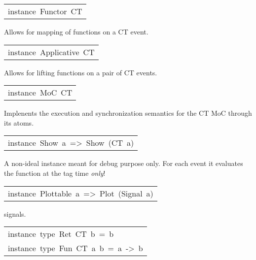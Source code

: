 \begin{haddockdesc}
\item[\begin{tabular}{@{}l}
instance\ Functor\ CT
\end{tabular}]\haddockbegindoc
Allows for mapping of functions on a CT event.\par

\end{haddockdesc}
\begin{haddockdesc}
\item[\begin{tabular}{@{}l}
instance\ Applicative\ CT
\end{tabular}]\haddockbegindoc
Allows for lifting functions on a pair of CT events.\par

\end{haddockdesc}
\begin{haddockdesc}
\item[\begin{tabular}{@{}l}
instance\ MoC\ CT
\end{tabular}]\haddockbegindoc
Implenents the execution and synchronization semantics for the CT
 MoC through its atoms.\par

\end{haddockdesc}
\begin{haddockdesc}
\item[\begin{tabular}{@{}l}
instance\ Show\ a\ =>\ Show\ (CT\ a)
\end{tabular}]\haddockbegindoc
A non-ideal instance meant for debug purpose only. For each event
 it evaluates the function at the tag time \emph{only}!\par

\end{haddockdesc}
\begin{haddockdesc}
\item[\begin{tabular}{@{}l}
instance\ Plottable\ a\ =>\ Plot\ (Signal\ a)
\end{tabular}]\haddockbegindoc
{} signals.\par

\end{haddockdesc}
\begin{haddockdesc}
\item[\begin{tabular}{@{}l}
instance\ type\ Ret\ CT\ b\ =\ b\\instance\ type\ Fun\ CT\ a\ b\ =\ a\ ->\ b
\end{tabular}]
\end{haddockdesc}

